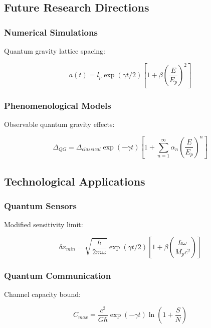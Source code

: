 \documentclass[12pt]{article}
\theoremstyle{plain}
\theoremstyle{definition}
\theoremstyle{remark}
\begin{document}
\subsection{Future Research Directions}

\subsubsection{Numerical Simulations}

Quantum gravity lattice spacing:

\begin{equation}
a(t) = l_p\exp(\gamma t/2)\left[1 + \beta\left(\frac{E}{E_p}\right)^2\right]
\end{equation}

\subsubsection{Phenomenological Models}

Observable quantum gravity effects:

\begin{equation}
\Delta_{QG} = \Delta_{classical}\exp(-\gamma t)\left[1 + \sum_{n=1}^{\infty}\alpha_n\left(\frac{E}{E_p}\right)^n\right]
\end{equation}

\subsection{Technological Applications}

\subsubsection{Quantum Sensors}

Modified sensitivity limit:

\begin{equation}
\delta x_{min} = \sqrt{\frac{\hbar}{2m\omega}}\exp(\gamma t/2)\left[1 + \beta\left(\frac{\hbar\omega}{M_pc^2}\right)\right]
\end{equation}

\subsubsection{Quantum Communication}

Channel capacity bound:

\begin{equation}
C_{max} = \frac{c^3}{G\hbar}\exp(-\gamma t)\ln\left(1 + \frac{S}{N}\right)
\end{equation}
\end{document}
